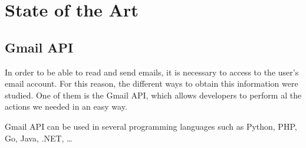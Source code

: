 \chapter{State of the Art}
\label{cap:estadoDeLaCuestion}

\section{Gmail API}
In order to be able to read and send emails, it is necessary to access to the user's email account. For this reason, the different ways to obtain this information were studied. One of them is the Gmail API, which allows developers to perform al the actions we needed in an easy way.

Gmail API can be used in several programming languages such as Python, PHP, Go, Java, .NET, \ldots
